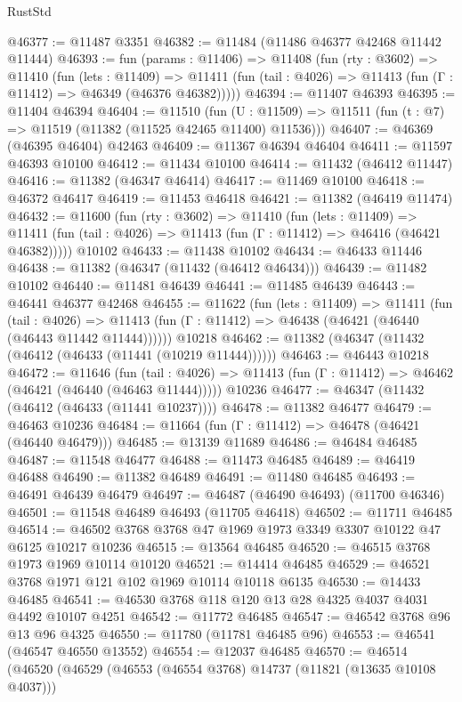 \begin{lexlean}{RustStd}
\begin{coremodule}
@46377 := @11487 @3351
@46382 := @11484 (@11486 @46377 @42468 @11442 @11444)
@46393 := fun (params : @11406) =>
  @11408
    (fun (rty : @3602) =>
    @11410
      (fun (lets : @11409) =>
      @11411 (fun (tail : @4026) => @11413 (fun (Γ : @11412) => @46349 (@46376 @46382)))))
@46394 := @11407 @46393
@46395 := @11404 @46394
@46404 := @11510
    (fun (U : @11509) => @11511 (fun (t : @7) => @11519 (@11382 (@11525 @42465 @11400) @11536)))
@46407 := @46369 (@46395 @46404) @42463
@46409 := @11367 @46394 @46404
@46411 := @11597 @46393 @10100
@46412 := @11434 @10100
@46414 := @11432 (@46412 @11447)
@46416 := @11382 (@46347 @46414)
@46417 := @11469 @10100
@46418 := @46372 @46417
@46419 := @11453 @46418
@46421 := @11382 (@46419 @11474)
@46432 := @11600
    (fun (rty : @3602) =>
    @11410
      (fun (lets : @11409) =>
      @11411 (fun (tail : @4026) => @11413 (fun (Γ : @11412) => @46416 (@46421 @46382)))))
    @10102
@46433 := @11438 @10102
@46434 := @46433 @11446
@46438 := @11382 (@46347 (@11432 (@46412 @46434)))
@46439 := @11482 @10102
@46440 := @11481 @46439
@46441 := @11485 @46439
@46443 := @46441 @46377 @42468
@46455 := @11622
    (fun (lets : @11409) =>
    @11411
      (fun (tail : @4026) =>
      @11413 (fun (Γ : @11412) => @46438 (@46421 (@46440 (@46443 @11442 @11444))))))
    @10218
@46462 := @11382 (@46347 (@11432 (@46412 (@46433 (@11441 (@10219 @11444))))))
@46463 := @46443 @10218
@46472 := @11646
    (fun (tail : @4026) => @11413 (fun (Γ : @11412) => @46462 (@46421 (@46440 (@46463 @11444)))))
    @10236
@46477 := @46347 (@11432 (@46412 (@46433 (@11441 @10237))))
@46478 := @11382 @46477
@46479 := @46463 @10236
@46484 := @11664 (fun (Γ : @11412) => @46478 (@46421 (@46440 @46479)))
@46485 := @13139 @11689
@46486 := @46484 @46485
@46487 := @11548 @46477
@46488 := @11473 @46485
@46489 := @46419 @46488
@46490 := @11382 @46489
@46491 := @11480 @46485
@46493 := @46491 @46439 @46479
@46497 := @46487 (@46490 @46493) (@11700 @46346)
@46501 := @11548 @46489 @46493 (@11705 @46418)
@46502 := @11711 @46485
@46514 := @46502 @3768 @3768 @47 @1969 @1973 @3349 @3307 @10122 @47 @6125 @10217 @10236
@46515 := @13564 @46485
@46520 := @46515 @3768 @1973 @1969 @10114 @10120
@46521 := @14414 @46485
@46529 := @46521 @3768 @1971 @121 @102 @1969 @10114 @10118 @6135
@46530 := @14433 @46485
@46541 := @46530 @3768 @118 @120 @13 @28 @4325 @4037 @4031 @4492 @10107 @4251
@46542 := @11772 @46485
@46547 := @46542 @3768 @96 @13 @96 @4325
@46550 := @11780 (@11781 @46485 @96)
@46553 := @46541 (@46547 @46550 @13552)
@46554 := @12037 @46485
@46570 := @46514
    (@46520
      (@46529
        (@46553 (@46554 @3768) @14737 (@11821 (@13635 @10108 @4037)))

\end{coremodule}
\end{lexlean}

